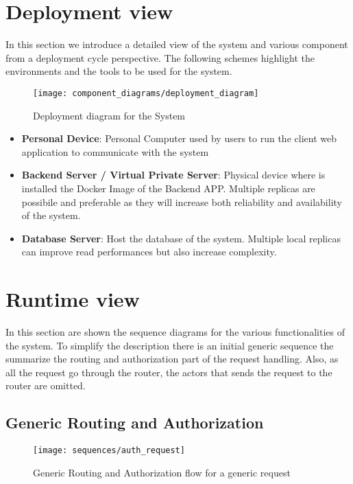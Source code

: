 \clearpage
\newpage
	
\section{Deployment view}
In this section we introduce a detailed view of the system and various component from a deployment cycle perspective. The following schemes highlight the environments and the tools to be used for the system.
	
	
\begin{figure}[h]
\texttt{[image: component\_diagrams/deployment\_diagram]}
\caption{Deployment diagram for the System}
\end{figure}
	
\begin{itemize}
	\item \textbf{Personal Device}: Personal Computer used by users to run the client web application to communicate with the system
	\item \textbf{Backend Server / Virtual Private Server}: Physical device where is installed the Docker Image of the Backend APP. Multiple replicas are possibile and preferable as they will increase both reliability and availability of the system.
	\item \textbf{Database Server}: Host the database of the system. Multiple local replicas can improve read performances but also increase complexity.
\end{itemize}
	
\clearpage
\newpage
	
\section{Runtime view}
In this section are shown the sequence diagrams for the various functionalities of the system. To simplify the description there is an initial generic sequence the summarize the routing and authorization part of the request handling. Also, as all the request go through the router, the actors that sends the request to the router are omitted.
	
\subsection{Generic Routing and Authorization}
\begin{figure}[h]
\texttt{[image: sequences/auth\_request]}
\caption{Generic Routing and Authorization flow for a generic request}
\end{figure}
	

